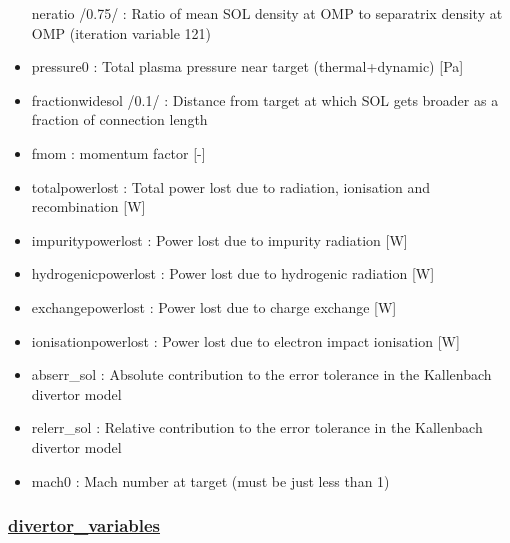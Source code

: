 \documentclass[]{article}
\begin{document}
\begin{itemize}
  neratio /0.75/ : Ratio of mean SOL density at OMP to separatrix
  density at OMP (iteration variable 121)
\item
  pressure0 : Total plasma pressure near target (thermal+dynamic)
  {[}Pa{]}
\item
  fractionwidesol /0.1/ : Distance from target at which SOL gets broader
  as a fraction of connection length
\item
  fmom : momentum factor {[}-{]}
\item
  totalpowerlost : Total power lost due to radiation, ionisation and
  recombination {[}W{]}
\item
  impuritypowerlost : Power lost due to impurity radiation {[}W{]}
\item
  hydrogenicpowerlost : Power lost due to hydrogenic radiation {[}W{]}
\item
  exchangepowerlost : Power lost due to charge exchange {[}W{]}
\item
  ionisationpowerlost : Power lost due to electron impact ionisation
  {[}W{]}
\item
  abserr\_sol : Absolute contribution to the error tolerance in the
  Kallenbach divertor model
\item
  relerr\_sol : Relative contribution to the error tolerance in the
  Kallenbach divertor model
\item
  mach0 : Mach number at target (must be just less than 1)
\end{itemize}

\hypertarget{divertor_variables}{%
\subsubsection{\texorpdfstring{\href{divertor_variables.html}{divertor\_variables}}{divertor\_variables}}\label{divertor_variables}}
\end{document}
